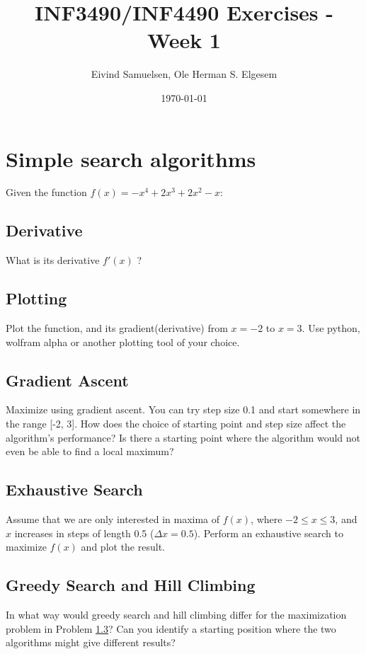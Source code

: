 \documentclass{article}           %
\title{\vspace{-2cm}INF3490/INF4490 Exercises - Week 1}
\author{Eivind Samuelsen, Ole Herman S. Elgesem}
\date{\today}
\newcommand\marginsymbol[1][0pt]{%
    \tabto*{0cm}\makebox[\dimexpr-1cm-#1\relax][r]{$\mathbb{P}$}\tabto*{\TabPrevPos}}
\begin{document}
    \renewcommand\marginsymbol[1][0pt]{%
  \tabto*{0cm}\makebox[-1cm][c]{$\mathbb{P}$}\tabto*{\TabPrevPos}}

\maketitle


\section{Simple search algorithms}

Given the function \(f(x) = -x^4 + 2x^3 + 2x^2 - x\):

\subsection{Derivative}
What is its derivative \(f'(x)\) ?

\subsection{Plotting \marginsymbol}
Plot the function, and its gradient(derivative) from \(x=-2\) to \(x=3\).
Use python, wolfram alpha or another plotting tool of your choice.

\subsection{Gradient Ascent \marginsymbol}
\label{subsec:grada}
Maximize using gradient ascent.
You can try step size 0.1 and start somewhere in the range [-2, 3].
How does the choice of starting point and step size affect the algorithm's performance?
Is there a starting point where the algorithm would not even be able to find a local maximum?

\subsection{Exhaustive Search \marginsymbol}
\label{subsec:exhaust}
Assume that we are only interested in maxima of \(f(x)\),
where \(-2\leq x \leq 3\),
and \(x\) increases in steps of length 0.5 (\(\Delta x = 0.5\)).
Perform an exhaustive search to maximize \(f(x)\) and plot the result.

\subsection{Greedy Search and Hill Climbing}
In what way would greedy search and hill climbing differ for the maximization problem in Problem \ref{subsec:grada}?
Can you identify a starting position where the two algorithms might give different results?
\end{document}
